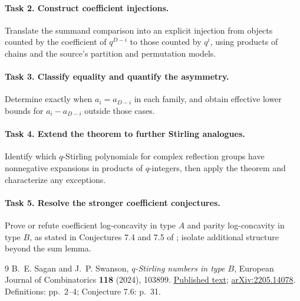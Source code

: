 \documentclass[11pt]{article}
\begin{document}
\paragraph{Task 2. Construct coefficient injections.}
Translate the summand comparison into an explicit injection from
objects counted by the coefficient of \(q^{D-i}\) to those counted
by \(q^i\), using products of chains and the source's partition and
permutation models.

\paragraph{Task 3. Classify equality and quantify the asymmetry.}
Determine exactly when \(a_i=a_{D-i}\) in each family, and obtain
effective lower bounds for \(a_i-a_{D-i}\) outside those cases.

\paragraph{Task 4. Extend the theorem to further Stirling analogues.}
Identify which \(q\)-Stirling polynomials for complex reflection
groups have nonnegative expansions in products of \(q\)-integers,
then apply the theorem and characterize any exceptions.

\paragraph{Task 5. Resolve the stronger coefficient conjectures.}
Prove or refute coefficient log-concavity in type \(A\) and parity
log-concavity in type \(B\), as stated in Conjectures 7.4 and 7.5 of
\cite{SS}; isolate additional structure beyond the sum lemma.

\begin{thebibliography}{9}
B.~E. Sagan and J.~P. Swanson,
\emph{\(q\)-Stirling numbers in type \(B\)},
European Journal of Combinatorics \textbf{118} (2024), 103899.
\href{https://par.nsf.gov/servlets/purl/10626831}{Published text};
\href{https://arxiv.org/abs/2205.14078}{arXiv:2205.14078}.
Definitions: pp.~2--4; Conjecture 7.6: p.~31.
\end{thebibliography}
\end{document}
